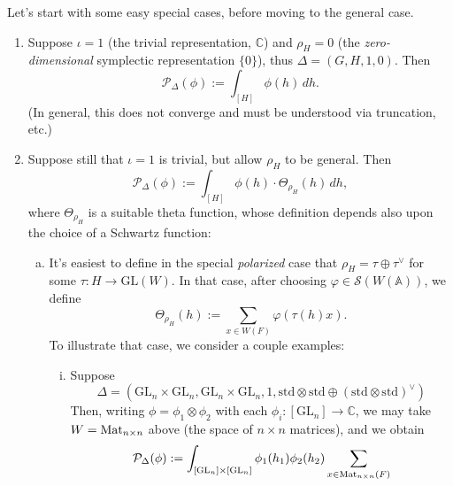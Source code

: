 \documentclass[reqno]{amsart} 
\numberwithin{theorem}{section}
\numberwithin{equation}{section}
\numberwithin{exercise}{section}
\begin{document}
Let's start with some easy special cases, before moving to the general case.
\begin{enumerate}
\item\label{enumerate:cq6tg85st6} Suppose $\iota = 1$ (the trivial representation, $\mathbb{C}$) and $\rho_H = 0$ (the \emph{zero-dimensional} symplectic representation $\{0\}$), thus $\Delta =(G, H, 1, 0)$.  Then
  \begin{equation*}
    \mathcal{P}_\Delta(\phi) := \int_{[H]} \phi(h) \, d h.
  \end{equation*}
  (In general, this does not converge and must be understood via truncation, etc.)
\item\label{enumerate:cq6tg85t0e} Suppose still that $\iota = 1$ is trivial, but allow $\rho_H$ to be general.  Then
  \begin{equation*}
    \mathcal{P}_\Delta(\phi) := \int_{[H]} \phi(h) \cdot \Theta_{\rho_H}(h) \, d h,
  \end{equation*}
  where $\Theta_{\rho_H}$ is a suitable theta function, whose definition depends also upon the choice of a Schwartz function:
  \begin{enumerate}[(a)]
  \item\label{enumerate:cq6thb0l6i} It's easiest to define in the special \emph{polarized} case that $\rho_H = \tau \oplus \tau^\vee$ for some $\tau : H \rightarrow\mathrm{GL}(W)$.  In that case, after choosing $\varphi \in \mathcal{S}(W(\mathbb{A}))$, we define
    \begin{equation*}
      \Theta_{\rho_H}(h) := \sum_{x \in W(F)} \varphi(\tau(h) x).
    \end{equation*}
    To illustrate that case, we consider a couple examples:
    \begin{enumerate}[(i)]
    \item\label{enumerate:cq6thb0n66} Suppose
      \begin{equation*}
        \Delta =(\mathrm{GL}_n \times \mathrm{GL}_n, \mathrm{GL}_n \times \mathrm{GL}_n, 1, \mathrm{std} \otimes \mathrm{std \oplus(\mathrm{std} \otimes \mathrm{std})^\vee})
      \end{equation*}
      Then, writing $\phi = \phi_1 \otimes \phi_2$ with each $\phi_i :[\mathrm{GL}_n] \rightarrow \mathbb{C}$, we may take $W = \operatorname{Mat}_{n \times n}$ above (the space of $n \times n$ matrices), and we obtain
      \begin{equation*}
        \mathcal{P}_\Delta(\phi) := \int_{[\mathrm{GL}_n] \times[\mathrm{GL}_n]} \phi_1(h_1) \phi_2(h_2) \sum_{x \in \Mat_{n \times n}(F)}

\end{equation*}
\end{enumerate}
\end{enumerate}
\end{enumerate}
\end{document}
